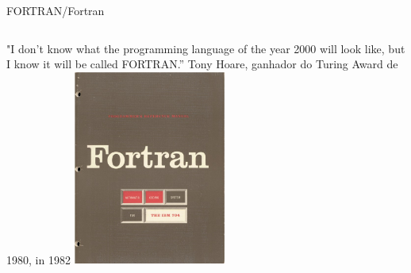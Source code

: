 \documentclass{beamer}
\begin{document}
\begin{darkframes}
  \begin{frame}{FORTRAN/Fortran}
    \begin{columns}
      "I don’t know what the programming language of the year 2000 will look like, but I know it will be called FORTRAN.”
      \vfill
      \textemdash  Tony Hoare, ganhador do Turing Award de 1980, in 1982
      \includegraphics[width=5cm]{figures/Fortran_acs_cover.jpeg}
    \end{columns}
  \end{frame}
  

\end{darkframes}
\end{document}
